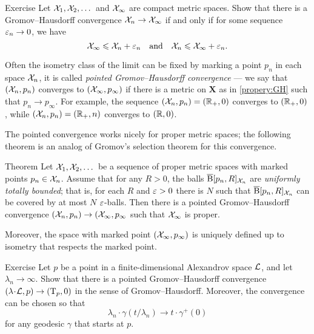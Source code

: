 \begin{thm}{Exercise}\label{ex:GH-po}
Let $\mathcal{X}_1,\mathcal{X}_2,\dots$ and $\mathcal{X}_\infty$ are compact metric spaces.
Show that there is a Gromov--Hausdorff convergence $\mathcal{X}_n\to\mathcal{X}_\infty$ if and only if for some sequence $\varepsilon_n\to 0$,
we have 
\[\mathcal{X}_\infty\leqslant \mathcal{X}_n+\varepsilon_n\quad\text{and}\quad \mathcal{X}_n\leqslant \mathcal{X}_\infty+\varepsilon_n.\]
\end{thm}

Often the isometry class of the limit can be fixed by marking a point $p_n$ in each space $\mathcal{X}_n$, it is called \emph{pointed Gromov--Hausdorff convergence} --- we say that $(\mathcal{X}_n,p_n)$ converges to $(\mathcal{X}_\infty,p_\infty)$ if there is a metric on $\bm{X}$ as in \ref{propery:GH} such that $p_n\to p_\infty$.
For example, the sequence $(\mathcal{X}_n,p_n)=(\mathbb{R}_+,0)$ converges to $(\mathbb{R}_+,0)$, while $(\mathcal{X}_n,p_n)=(\mathbb{R}_+,n)$ converges to $(\mathbb{R},0)$.

The pointed convergence works nicely for proper metric spaces;
the following theorem is an analog of Gromov's selection theorem for this convergence.

\begin{thm}{Theorem}\label{thm:pointed-gromov-compactness}
Let $\mathcal{X}_1,\mathcal{X}_2,\dots$ be a sequence of proper metric spaces with marked points $p_n\in\mathcal{X}_n$.
Assume that for any $R>0$, the balls $\overline{\mathrm{B}}{}[p_n,R]_{\mathcal{X}_n}$ are \emph{uniformly totally bounded};
that is, for each $R$ and $\varepsilon>0$ there is $N$ such that $\overline{\mathrm{B}}{}[p_n,R]_{\mathcal{X}_n}$ can be covered by at most $N$ $\varepsilon$-balls.
Then there is a pointed Gromov--Hausdorff convergence $(\mathcal{X}_n,p_n)\to (\mathcal{X}_\infty,p_\infty$ such that $\mathcal{X}_\infty$ is proper.

Moreover, the space with marked point $(\mathcal{X}_\infty,p_\infty)$ is uniquely defined up to isometry that respects the marked point.
\end{thm}

\begin{thm}{Exercise}\label{ex:GHto-tangent}
Let $p$ be a point in a finite-dimensional Alexandrov space $\mathcal{L}$,
and let $\lambda_n\to\infty$.
Show that there is a pointed Gromov--Hausdorff convergence $(\lambda\cdot \spc{L},p)\z\to (\T_p,0)$ in the sense of Gromov--Hausdorff.
Moreover, the convergence can be chosen so that  
\[\lambda_n\cdot \gamma(t/\lambda_n)\to t\cdot \gamma^+(0)\]
for any geodesic $\gamma$ that starts at $p$. 
\end{thm}


